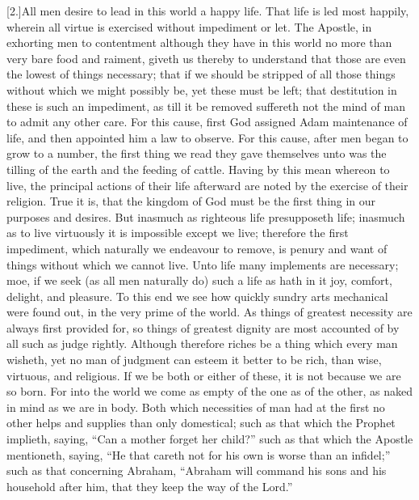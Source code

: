 [2.]All men desire to lead in this world a happy life. That life is led most happily, wherein all virtue is exercised without impediment or let. The Apostle, in exhorting men to contentment although they have in this world no more than very bare food and raiment, giveth us thereby to understand that those are even the lowest of things necessary; that if we should be stripped of all those things without which we might possibly be, yet these must be left; that destitution in these is such an impediment, as till it be removed suffereth not the mind of man to admit any other care. For this cause, first God assigned Adam maintenance of life, and then appointed him a law to observe. For this cause, after men began to grow to a number, the first thing we read they gave themselves unto was the tilling of the earth and the feeding of cattle. Having by this mean whereon to live, the principal actions of their life afterward are noted by the exercise of their religion. True it is, that the kingdom of God must be the first thing in our purposes and desires. But inasmuch as righteous life presupposeth life; inasmuch as to live virtuously it is impossible except we live; therefore the first impediment, which naturally we endeavour to remove, is penury and want of things without which we cannot live. Unto life many implements are necessary; moe, if we seek (as all men naturally do) such a life as hath in it joy, comfort, delight, and pleasure. To this end we see how quickly sundry arts mechanical were found out, in the very prime of the world. As things of greatest  necessity are always first provided for, so things of greatest dignity are most accounted of by all such as judge rightly. Although therefore riches be a thing which every man wisheth, yet no man of judgment can esteem it better to be rich, than wise, virtuous, and religious. If we be both or either of these, it is not because we are so born. For into the world we come as empty of the one as of the other, as naked in mind as we are in body. Both which necessities of man had at the first no other helps and supplies than only domestical; such as that which the Prophet implieth, saying, “Can a mother forget her child?” such as that which the Apostle mentioneth, saying, “He that careth not for his own is worse than an infidel;” such as that concerning Abraham, “Abraham will command his sons and his household after him, that they keep the way of the Lord.”

